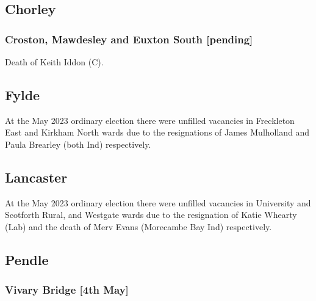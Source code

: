 \documentclass[a4paper,openany]{book}
\begin{document}
\begin{resultsiii}
\subsection*{Chorley}

\subsubsection*{Croston, Mawdesley and Euxton South \hspace*{\fill}\nolinebreak[1]%
	\enspace\hspace*{\fill}
	[pending]}


Death of Keith Iddon (C).

\subsection*{Fylde}

At the May 2023 ordinary election there were unfilled vacancies in Freckleton East and Kirkham North wards due to the resignations of James Mulholland and Paula Brearley (both Ind) respectively.%
%

\subsection*{Lancaster}

At the May 2023 ordinary election there were unfilled vacancies in University and Scotforth Rural, and Westgate wards due to the resignation of Katie Whearty (Lab) and the death of Merv Evans (Morecambe Bay Ind) respectively.%
%

\subsection*{Pendle}

\subsubsection*{Vivary Bridge \hspace*{\fill}\nolinebreak[1]%
	\enspace\hspace*{\fill}
	[4th May]}


\end{resultsiii}
\end{document}
